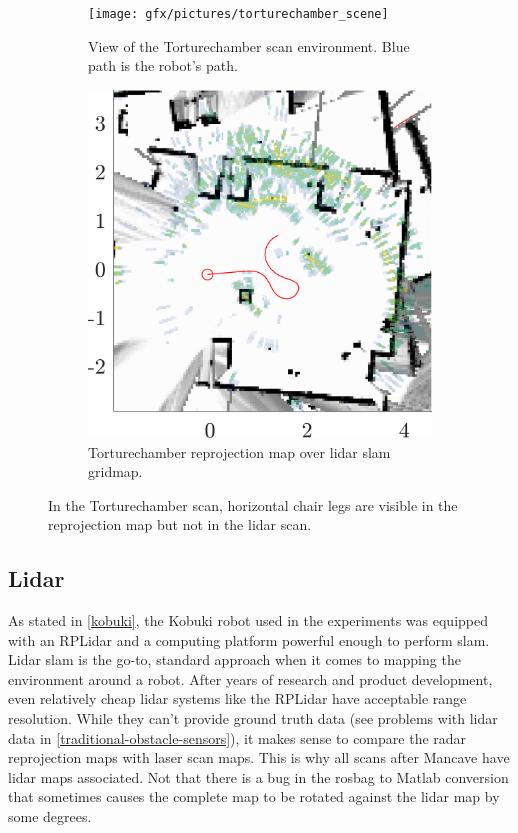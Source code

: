 \begin{figure}
    \begin{subfigure}[t]{.485\textwidth}
        \centering
        \texttt{[image: gfx/pictures/torturechamber\_scene]}
        \caption{View of the Torturechamber scan environment. Blue path is the robot's path.}
        \label{fig:chairs_scene}
    \end{subfigure}%
    \hfill%
    \begin{subfigure}[t]{.485\textwidth}
        \centering
        \includegraphics[max width=\textwidth]{gfx/results/torturechamber_map}
        \caption{Torturechamber reprojection map over lidar slam gridmap.}
        \label{fig:chairs_map}
    \end{subfigure}%
    \caption{In the Torturechamber scan, horizontal chair legs are visible in the reprojection map but not in the lidar scan.}
    \label{fig:chairlegs}
\end{figure}

\subsection{Lidar}\label{lidar-1}
As stated in \cref{kobuki}, the Kobuki robot used in the experiments was equipped with an RPLidar and a computing platform powerful enough to perform slam. Lidar slam is the go-to, standard approach when it comes to mapping the environment around a robot. After years of research and product development, even relatively cheap lidar systems like the RPLidar have acceptable range resolution. While they can't provide ground truth data (see problems with lidar data in \cref{traditional-obstacle-sensors}), it makes sense to compare the radar reprojection maps with laser scan maps. This is why all scans after Mancave have lidar maps associated.
Not that there is a bug in the rosbag to Matlab conversion that sometimes causes the complete map to be rotated against the lidar map by some degrees.
